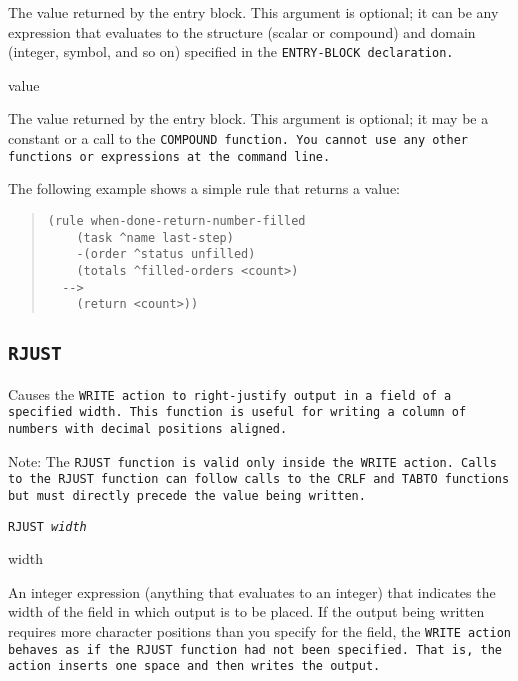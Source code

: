 {{\begin{arguments}
  The value returned by the entry block. This argument is optional; it
  can be any expression that evaluates to the structure (scalar or
  compound) and domain (integer, symbol, and so on) specified in the
  \tt{ENTRY-BLOCK} declaration.

\item[value]

  The value returned by the entry block. This argument is optional; it
  may be a constant or a call to the \tt{COMPOUND} function. You cannot use
  any other functions or expressions at the command line.
\end{arguments}

\Example

The following example shows a simple rule that returns a
value:

\begin{quote}
\begin{verbatim}
(rule when-done-return-number-filled
    (task ^name last-step)
    -(order ^status unfilled)
    (totals ^filled-orders <count>)
  -->
    (return <count>))
\end{verbatim}
\end{quote}

\subsection{\tt{RJUST}}

Causes the \tt{WRITE} action to right-justify output in a field of a
specified width. This function is useful for writing a column of
numbers with decimal positions aligned.

Note: The \tt{RJUST} function is valid only inside the \tt{WRITE}
action. Calls to the \tt{RJUST} function can follow calls to the
\tt{CRLF} and \tt{TABTO} functions but must directly precede the value
being written.

\Format

\tt{RJUST} \it{width}

\begin{arguments}

\item[width]

  An integer expression (anything that evaluates to an integer) that
  indicates the width of the field in which output is to be placed. If
  the output being written requires more character positions than you
  specify for the field, the \tt{WRITE} action behaves as if the
  \tt{RJUST} function had not been specified. That is, the action
  inserts one space and then writes the output.
\end{arguments}

}}
